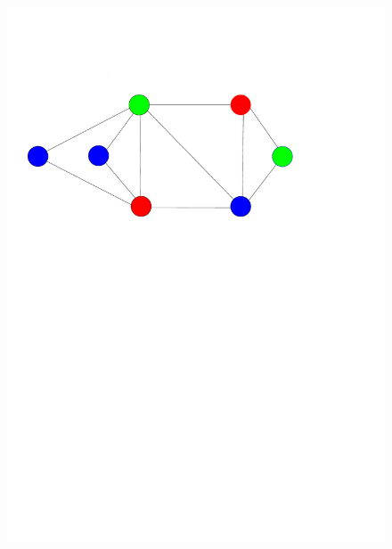 \documentclass[12pt,a4paper,twoside]{scrartcl}
\numberwithin{equation}{section}
\begin{document}
\begin{figure}[h!]
  \centering
  \begin{minipage}[b]{0.49\textwidth} 
\includegraphics[scale = 0.5]{1/nodeColoring2.pdf}
  \end{minipage}
  \hfill
  \begin{minipage}[b]{0.49\textwidth}

\end{minipage}
\end{figure}
\end{document}
